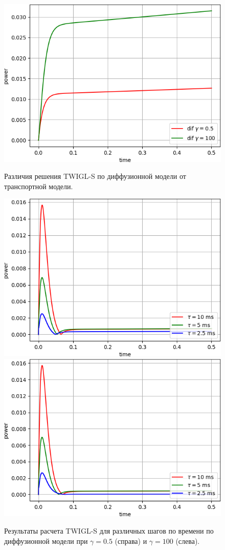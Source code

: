 \documentclass{crm-article}
\begin{document}
\begin{figure}[ht]
\begin{center}
	\includegraphics[width=0.5\linewidth]{odds_s.png}\\
	\caption{\label{image:canonsummary} Различия решения TWIGL-S по диффузионной модели от транспортной модели.}
	\label{ris:odds_s}
\end{center}
\end{figure}

\begin{figure}[ht]
\begin{center}
	\includegraphics[width=0.45\linewidth]{dif_tau_s.png}
	\includegraphics[width=0.45\linewidth]{dif_tau_s_100.png}\\
	\caption{\label{image:canonsummary} Результаты расчета TWIGL-S для различных шагов по времени по диффузионной модели при $\gamma=0.5$ (справа) и $\gamma=100$ (слева).}
	\label{ris:dif_tau_s_0.5}
\end{center}
\end{figure}

\end{document}
